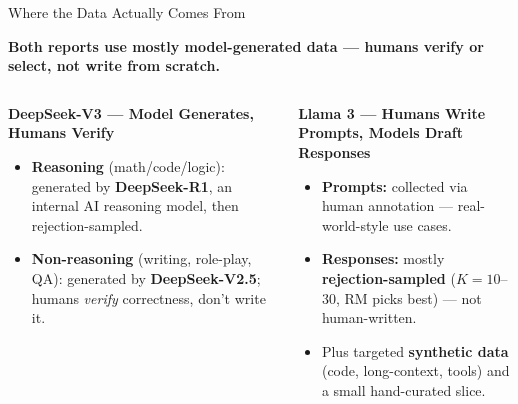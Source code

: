 \documentclass[aspectratio=169]{beamer}
\begin{document}
\begin{frame}{Where the Data Actually Comes From}
  \footnotesize
  \begin{center}
  \textbf{Both reports use mostly model-generated data --- humans verify or select, not write from
  scratch.}
  \end{center}
  \vspace{2pt}

  \begin{columns}[t]
      \begin{warmbox}
        \footnotesize
        \textbf{\color{AtlasWarm}DeepSeek-V3 --- Model Generates, Humans Verify}
        \begin{itemize}[itemsep=1pt,topsep=2pt]
          \item \textbf{Reasoning} (math/code/logic): generated by \textbf{DeepSeek-R1}, an internal
            AI reasoning model, then rejection-sampled.
          \item \textbf{Non-reasoning} (writing, role-play, QA): generated by \textbf{DeepSeek-V2.5};
            humans \emph{verify} correctness, don't write it.
        \end{itemize}
      \end{warmbox}
      \begin{coolbox}
        \footnotesize
        \textbf{\color{AtlasCool}Llama 3 --- Humans Write Prompts, Models Draft Responses}
        \begin{itemize}[itemsep=1pt,topsep=2pt]
          \item \textbf{Prompts:} collected via human annotation --- real-world-style use cases.
          \item \textbf{Responses:} mostly \textbf{rejection-sampled} ($K{=}10$--30, RM picks best)
            --- not human-written.
          \item Plus targeted \textbf{synthetic data} (code, long-context, tools) and a small
            hand-curated slice.
        \end{itemize}
      \end{coolbox}
  \end{columns}
  \vspace{4pt}



\end{frame}
\end{document}
